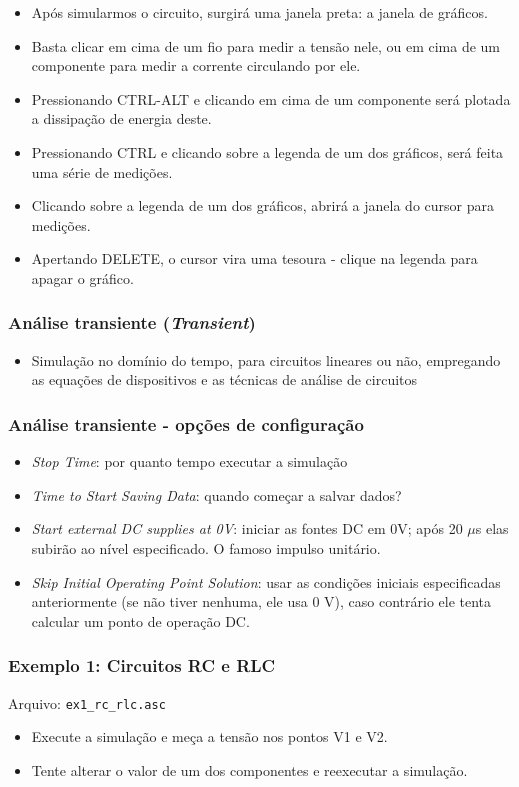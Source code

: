 \documentclass{beamer}
\begin{document}
\begin{frame}
\begin{itemize}
\item{Após simularmos o circuito, surgirá uma janela preta: a janela de gráficos.}
\item{Basta clicar em cima de um fio para medir a tensão nele, ou em cima de um componente para medir a corrente circulando por ele.}
\item{Pressionando CTRL-ALT e clicando em cima de um componente será plotada a dissipação de energia deste.}
\item{Pressionando CTRL e clicando sobre a legenda de um dos gráficos, será feita uma série de medições.}
\item{Clicando sobre a legenda de um dos gráficos, abrirá a janela do cursor para medições.}
\item{Apertando DELETE, o cursor vira uma tesoura - clique na legenda para apagar o gráfico.}
\end{itemize}
\end{frame}

\begin{frame}
\frametitle{Análise transiente (\textit{Transient})}
\begin{itemize}
\item{Simulação no domínio do tempo, para circuitos lineares ou não, empregando as equações de dispositivos e as técnicas de análise de circuitos}
\end{itemize}
\end{frame}

\begin{frame}
\frametitle{Análise transiente - opções de configuração}
\begin{itemize} 
\item \textit{Stop Time}: por quanto tempo executar a simulação
\item \textit{Time to Start Saving Data}: quando começar a salvar dados?
\item \textit{Start external DC supplies at 0V}: iniciar as fontes DC em 0V; após 20 $\mu$s elas subirão ao nível especificado. O famoso impulso unitário.
\item \textit{Skip Initial Operating Point Solution}: usar as condições iniciais especificadas anteriormente (se não tiver nenhuma, ele usa 0 V), caso contrário ele tenta calcular um ponto de operação DC.
\end{itemize}
\end{frame}

\begin{frame}
\frametitle{Exemplo 1: Circuitos RC e RLC}
Arquivo: \texttt{ex1\_rc\_rlc.asc}
\begin{itemize}
\item{Execute a simulação e meça a tensão nos pontos V1 e V2.}
\item{Tente alterar o valor de um dos componentes e reexecutar a simulação.}
\end{itemize}
\end{frame}
\end{document}
